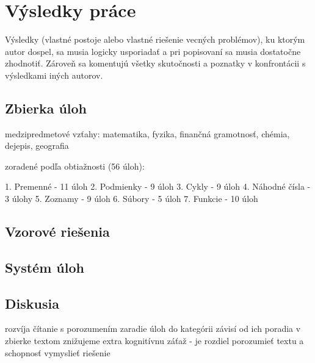\chapter{Výsledky práce}
Výsledky (vlastné postoje alebo vlastné riešenie vecných problémov), ku ktorým autor dospel, sa musia logicky usporiadať a pri popisovaní sa musia dostatočne zhodnotiť. Zároveň sa komentujú všetky skutočnosti a poznatky v konfrontácii s výsledkami iných autorov. 

\section{Zbierka úloh}
medzipredmetové vzťahy: matematika, fyzika, finančná gramotnosť, chémia, dejepis, geografia

zoradené podľa obtiažnosti (56 úloh): 

1. Premenné - 11 úloh
2. Podmienky - 9 úloh
3. Cykly - 9 úloh
4. Náhodné čísla - 3 úlohy
5. Zoznamy - 9 úloh
6. Súbory - 5 úloh
7. Funkcie - 10 úloh









\section{Vzorové riešenia}









\section{Systém úloh}




\section{Diskusia} 
rozvíja čítanie s porozumením
zaradie úloh do kategórii závisí od ich poradia v zbierke
textom znižujeme extra kognitívnu záťaž - je rozdiel porozumieť textu a schopnosť vymyslieť riešenie

